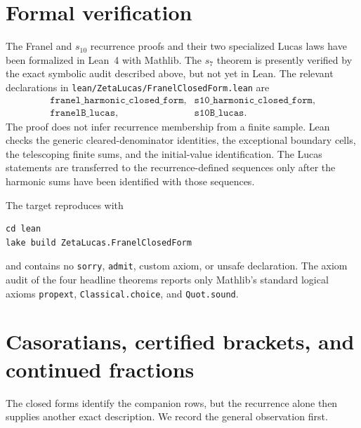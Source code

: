 \documentclass[11pt,reqno]{amsart}
\theoremstyle{definition}
\theoremstyle{remark}
\begin{document}
\section{Formal verification}

The Franel and $s_{10}$ recurrence proofs and their two specialized Lucas laws
have been formalized in Lean~4 with Mathlib.  The $s_7$ theorem is presently
verified by the exact symbolic audit described above, but not yet in Lean.
The relevant declarations in
\nolinkurl{lean/ZetaLucas/FranelClosedForm.lean} are
\[
\begin{array}{ll}
\texttt{franel\_harmonic\_closed\_form},&
\texttt{s10\_harmonic\_closed\_form},\\
\texttt{franelB\_lucas},&\texttt{s10B\_lucas}.
\end{array}
\]
The proof does not infer recurrence membership from a finite sample.  Lean
checks the generic cleared-denominator identities, the exceptional boundary
cells, the telescoping finite sums, and the initial-value identification.  The
Lucas statements are transferred to the recurrence-defined sequences only
after the harmonic sums have been identified with those sequences.

The target reproduces with
\begin{verbatim}
cd lean
lake build ZetaLucas.FranelClosedForm
\end{verbatim}
and contains no \texttt{sorry}, \texttt{admit}, custom axiom, or unsafe
declaration.  The axiom audit of the four headline theorems reports only
Mathlib's standard logical axioms \texttt{propext},
\texttt{Classical.choice}, and \texttt{Quot.sound}.

\section{Casoratians, certified brackets, and continued fractions}\label{sec:cas}

The closed forms identify the companion rows, but the recurrence alone then
supplies another exact description.  We record the general observation first.
\end{document}
